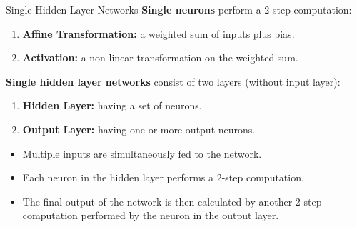 \documentclass[11pt,compress,t,notes=noshow, xcolor=table]{beamer}
\begin{document}
\begin{vbframe}{Single Hidden Layer Networks}
\textbf{Single neurons} perform a 2-step computation:
\begin{enumerate}
\item \textbf{Affine Transformation:} a weighted sum of inputs plus bias.
\item \textbf{Activation:} a non-linear transformation on the weighted sum.
\end{enumerate}
\vspace{.5cm}
\textbf{Single hidden layer networks} consist of two layers (without input layer):
\begin{enumerate}
\item \textbf{Hidden Layer:} having a set of neurons.
\item \textbf{Output Layer:} having one or more output neurons.
\end{enumerate}
\vspace{.5cm}
\begin{itemize}
\item Multiple inputs are simultaneously fed to the network.
\vspace{.2cm}
\item Each neuron in the hidden layer performs a 2-step computation.
\vspace{.2cm}
\item The final output of the network is then calculated by another 2-step computation performed by the neuron in the output layer.
\end{itemize}
\end{vbframe}
\end{document}
